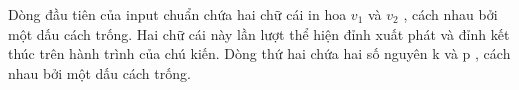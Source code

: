 Dòng đầu tiên của input chuẩn chứa hai chữ cái in hoa       $v_{1}$      và       $v_{2}$      , cách nhau bởi một dấu cách trống. Hai chữ cái này lần lượt thể hiện đỉnh xuất phát và đỉnh kết thúc trên hành trình của chú kiến. Dòng thứ hai chứa hai số nguyên       k      và       p      , cách nhau bởi một dấu cách trống.